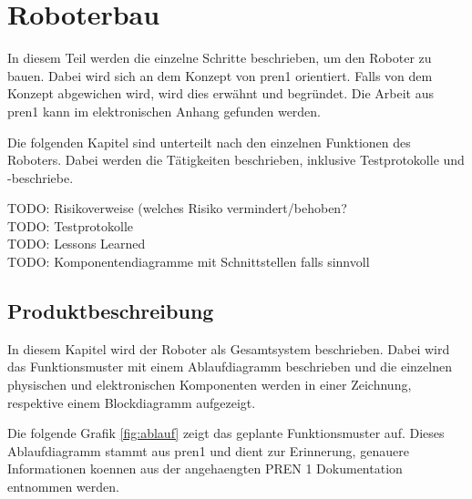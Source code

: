 \section{Roboterbau}

In diesem Teil werden die einzelne Schritte beschrieben, um den Roboter zu bauen. Dabei wird sich an dem Konzept von \acrshort{pren1} orientiert. Falls von dem Konzept abgewichen wird, wird dies erwähnt und begründet. Die Arbeit aus \acrshort{pren1} kann im elektronischen Anhang gefunden werden.

Die folgenden Kapitel sind unterteilt nach den einzelnen Funktionen des Roboters. Dabei werden die Tätigkeiten beschrieben, inklusive Testprotokolle und -beschriebe.

TODO: Risikoverweise (welches Risiko vermindert/behoben? \\
TODO: Testprotokolle \\
TODO: Lessons Learned \\
TODO: Komponentendiagramme mit Schnittstellen falls sinnvoll \\

\subsection{Produktbeschreibung}

In diesem Kapitel wird der Roboter als Gesamtsystem beschrieben. Dabei wird das Funktionsmuster mit einem Ablaufdiagramm beschrieben und die einzelnen physischen und elektronischen Komponenten werden in einer Zeichnung, respektive einem Blockdiagramm aufgezeigt.


Die folgende Grafik \ref{fig:ablauf} zeigt das geplante Funktionsmuster auf. Dieses Ablaufdiagramm stammt aus \acrshort{pren1} und dient zur Erinnerung, genauere Informationen koennen aus der angehaengten PREN 1 Dokumentation entnommen werden.

